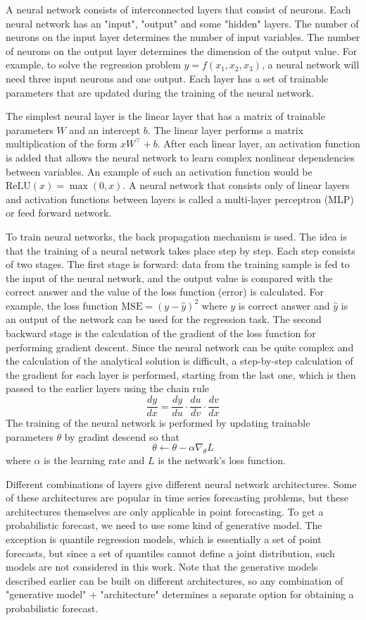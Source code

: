 \documentclass[12pt,a4paper]{article}
\begin{document}
A neural network consists of interconnected layers that consist of neurons. Each neural network has an "input", "output" and some "hidden" layers. The number of neurons on the input layer determines the number of input variables. The number of neurons on the output layer determines the dimension of the output value. For example, to solve the regression problem $y = f (x_1, x_2, x_3)$, a neural network will need three input neurons and one output. Each layer has a set of trainable parameters that are updated during the training of the neural network. 

The simplest neural layer is the linear layer that has a matrix of trainable parameters $W$ and an intercept $b$. The linear layer performs a matrix multiplication of the form $xW^\top + b$. After each linear layer, an activation function is added that allows the neural network to learn complex nonlinear dependencies between variables. An example of such an activation function would be $\text{ReLU} (x) = \max (0, x)$. A neural network that consists only of linear layers and activation functions between layers is called a multi-layer perceptron (MLP) or feed forward network. 

To train neural networks, the back propagation mechanism is used. The idea is that the training of a neural network takes place step by step. Each step consists of two stages. The first stage is forward: data from the training sample is fed to the input of the neural network, and the output value is compared with the correct answer and the value of the loss function (error) is calculated. For example, the loss function $\text{MSE} = (y - \hat y)^2$ where $y$ is correct answer and $\hat y$ is an output of the network can be used for the regression task. The second backward stage is the calculation of the gradient of the loss function for performing gradient descent. Since the neural network can be quite complex and the calculation of the analytical solution is difficult, a step-by-step calculation of the gradient for each layer is performed, starting from the last one, which is then passed to the earlier layers using the chain rule
$$\frac{d y}{d x}=\frac{d y}{d u} \cdot \frac{d u}{d v} \cdot \frac{d v}{d x}$$
The training of the neural network is performed by updating trainable parameters $\theta$ by gradint descend so that
$$\theta \leftarrow \theta - \alpha \nabla_\theta L$$
where $\alpha$ is the learning rate and $L$ is the network's loss function.

Different combinations of layers give different neural network architectures. Some of these architectures are popular in time series forecasting problems, but these architectures themselves are only applicable in point forecasting. To get a probabilistic forecast, we need to use some kind of generative model. The exception is quantile regression models, which is essentially a set of point forecasts, but since a set of quantiles cannot define a joint distribution, such models are not considered in this work. Note that the generative models described earlier can be built on different architectures, so any combination of "generative model" + "architecture" determines a separate option for obtaining a probabilistic forecast.
\end{document}
